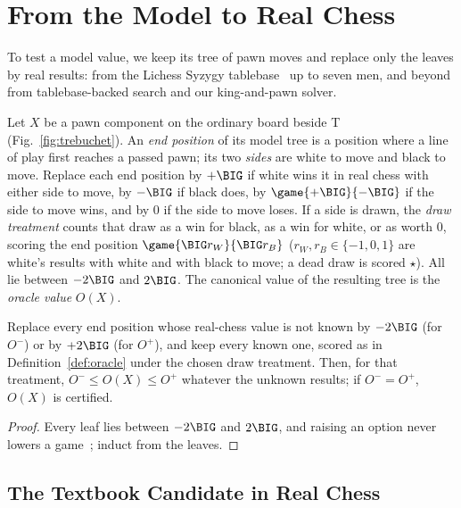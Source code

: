 \section{From the Model to Real Chess}\label{sec:real}

To test a model value, we keep its tree of pawn moves and replace only the leaves by real results: from the
Lichess Syzygy tablebase~\cite{LichessTB} up to seven men, and beyond from tablebase-backed search and our
king-and-pawn solver.

\begin{definition}\label{def:oracle}
Let $X$ be a pawn component on the ordinary board beside T (Fig.~\ref{fig:trebuchet}). An \emph{end position}
of its model tree is a position where a line of play first reaches a passed pawn; its two \emph{sides} are
white to move and black to move. Replace each end position by $+\BIG$ if white wins it in real chess with either
side to move, by $-\BIG$ if black does, by $\game{+\BIG}{-\BIG}$ if the side to move wins, and by $0$ if the
side to move loses. If a side is drawn, the \emph{draw treatment} counts that draw as a win for black, as a win
for white, or as worth $0$, scoring the end position $\game{\BIG r_W}{\BIG r_B}$ ($r_W,r_B\in\{-1,0,1\}$ are
white's results with white and with black to move; a dead draw is scored $\star$). All lie between $-2\BIG$ and $2\BIG$. The canonical value of the resulting tree is the \emph{oracle value} $O(X)$.
\end{definition}

\begin{lemma}\label{lem:sandwich}
Replace every end position whose real-chess value is not known by $-2\BIG$ (for $O^-$) or by $+2\BIG$ (for
$O^+$), and keep every known one, scored as in Definition~\ref{def:oracle} under the chosen draw treatment. Then, for that treatment, $O^-\le O(X)\le O^+$ whatever the unknown results; if $O^-=O^+$,
$O(X)$ is certified.
\end{lemma}
\begin{proof}
Every leaf lies between $-2\BIG$ and $2\BIG$, and raising an option never lowers a
game~\cite{Siegel2013}; induct from the leaves.
\end{proof}

\subsection{The Textbook Candidate in Real Chess}\label{sec:real-cand}

